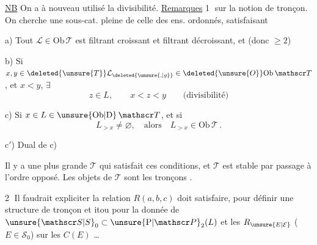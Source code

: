\uline{NB} On a à nouveau utilisé la divisibilité.
\uline{Remarques} \textcircled{1}  sur la notion de tronçon. On cherche une sous-cat. pleine  de celle des ens. ordonnés, satisfaisant

a) Tout $\mathcal L\in\mathrm{Ob}\,\mathscr T$ est filtrant croissant et filtrant décroissant, et   (donc $\geq2$)

b) Si $x,y\in\deleted{\unsure{T}}\mathcal L_{\deleted{\unsure{,|g}}}\in\deleted{\unsure{O}}\mathrm{Ob}\,\mathscr T$, et $x<y$, $\exists$
\[
 z\in L,\qquad x<z<y\qquad\text{(divisibilité)}
\]

c) Si $x\in L\in\unsure{\mathrm{Ob}|\mathrm D}\,\mathscr T$,  et si
\[
 L_{>x}\ne\varnothing,\quad\text{alors}\quad L_{>x}\in\mathrm{Ob}\,\mathscr T\,.
\]

c$'$) Dual de c)

Il y a une plus grande $\mathscr T$ qui satisfait ces conditions, et $\mathscr T$ est stable par passage à l'ordre opposé. Les objets de $\mathscr T$ sont les tronçons .

\textcircled{2} Il faudrait expliciter   la relation $R(a,b,c)$ doit satisfaire, pour définir une structure de tronçon \unsure{,} et itou pour la donnée de $\unsure{\mathscr S|S}_0\subset\unsure{\mathrm P|\mathscr P}_2(L)$ et les $R_{\unsure{E|\mathcal E}}$\unsure{,} ($E\in\mathscr S_0$) sur les $C(E)$ \ldots

